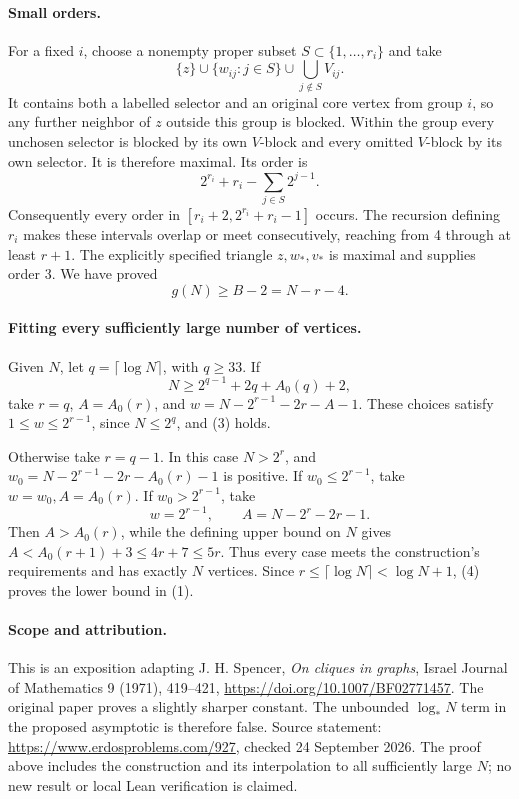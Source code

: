 \paragraph{Small orders.}
For a fixed \(i\), choose a nonempty proper subset \(S\subset\{1,\ldots,r_i\}\) and take
\[
 \{z\}\cup\{w_{ij}:j\in S\}\cup\bigcup_{j\notin S}V_{ij}.
\]
It contains both a labelled selector and an original core vertex from group \(i\), so any further neighbor of \(z\) outside this group is blocked. Within the group every unchosen selector is blocked by its own \(V\)-block and every omitted \(V\)-block by its own selector. It is therefore maximal. Its order is
\[
 2^{r_i}+r_i-\sum_{j\in S}2^{j-1}.
\]
Consequently every order in \([r_i+2,2^{r_i}+r_i-1]\) occurs. The recursion defining \(r_i\) makes these intervals overlap or meet consecutively, reaching from 4 through at least \(r+1\). The explicitly specified triangle \(z,w_*,v_*\) is maximal and supplies order 3. We have proved
\[
 g(N)\geq B-2=N-r-4. \tag{4}
\]

\paragraph{Fitting every sufficiently large number of vertices.}
Given \(N\), let \(q=\lceil\log N\rceil\), with \(q\geq33\). If
\[
 N\geq2^{q-1}+2q+A_0(q)+2,
\]
take \(r=q\), \(A=A_0(r)\), and
\(w=N-2^{r-1}-2r-A-1\). These choices satisfy \(1\leq w\leq2^{r-1}\), since \(N\leq2^q\), and (3) holds.

Otherwise take \(r=q-1\). In this case \(N>2^r\), and
\(w_0=N-2^{r-1}-2r-A_0(r)-1\) is positive. If \(w_0\leq2^{r-1}\), take \(w=w_0,A=A_0(r)\). If \(w_0>2^{r-1}\), take
\[
 w=2^{r-1},\qquad A=N-2^r-2r-1.
\]
Then \(A>A_0(r)\), while the defining upper bound on \(N\) gives
\(A<A_0(r+1)+3\leq4r+7\leq5r\). Thus every case meets the construction's requirements and has exactly \(N\) vertices. Since \(r\leq\lceil\log N\rceil<\log N+1\), (4) proves the lower bound in (1).

\paragraph{Scope and attribution.}
This is an exposition adapting J. H. Spencer, \emph{On cliques in graphs}, Israel Journal of Mathematics 9 (1971), 419--421, \url{https://doi.org/10.1007/BF02771457}. The original paper proves a slightly sharper constant. The unbounded \(\log_*N\) term in the proposed asymptotic is therefore false. Source statement: \url{https://www.erdosproblems.com/927}, checked 24 September 2026. The proof above includes the construction and its interpolation to all sufficiently large \(N\); no new result or local Lean verification is claimed.

